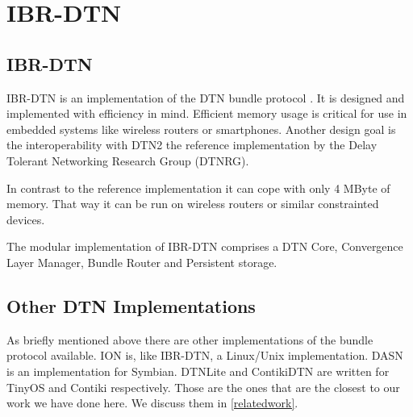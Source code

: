 \chapter{IBR-DTN}
\label{ibr-dtn}
\section{IBR-DTN}

IBR-DTN is an implementation of the DTN bundle protocol \cite{RFC5050}. It is designed and
implemented with efficiency in mind. Efficient memory usage is critical for
use in embedded systems like wireless routers or smartphones. Another design
goal is the interoperability with DTN2 the reference implementation by the Delay
Tolerant Networking Research Group (DTNRG).

In contrast to the reference implementation it can cope with only 4 MByte of
memory. That way it can be run on wireless routers or similar constrainted
devices.

The modular implementation of IBR-DTN comprises a DTN Core, Convergence Layer
Manager, Bundle Router and Persistent storage.

\section{Other DTN Implementations}

As briefly mentioned above there are other implementations of the bundle
protocol available. ION is, like IBR-DTN, a Linux/Unix implementation. DASN is
an implementation for Symbian. DTNLite and ContikiDTN are written for TinyOS and
Contiki respectively. Those are the ones that are the closest to our work we
have done here. We discuss them in \ref{relatedwork}.
